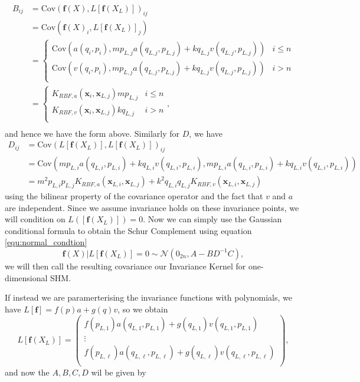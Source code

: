 \documentclass{statsmsc}
\begin{document}
\begin{align*}
B_{ij} &= \mathrm{Cov}(\mathbf{f}(X), L[\mathbf{f}(X_L)])_{ij} \\
       &= \mathrm{Cov}(\mathbf{f}(X)_i, L[\mathbf{f}(X_L)]_j) \\ 
       &= \begin{cases}
        \mathrm{Cov}(a(q_i, p_i), mp_{L,j}a(q_{L,j},p_{L,j}) + kq_{L,j}v(q_{L,j},p_{L,j})) & i\le n \\ 
        \mathrm{Cov}(v(q_i, p_i), mp_{L,j}a(q_{L,j},p_{L,j}) + kq_{L,j}v(q_{L,j},p_{L,j})) & i>n \\ 
       \end{cases} \\
       &= \begin{cases}
        K_{RBF,a}(\mathbf{x}_i, \mathbf{x}_{L,j}) mp_{L,j} & i\le n \\ 
        K_{RBF,v}(\mathbf{x}_i, \mathbf{x}_{L,j}) kq_{L,j} & i>n \\ 
       \end{cases}, \\
\end{align*}
and hence we have the form above. 
Similarly for $D$, we have
\begin{align*}
D_{ij} &= \mathrm{Cov}(L[\mathbf{f}(X_L)], L[\mathbf{f}(X_L)])_{ij} \\
       &= \mathrm{Cov}(mp_{L,i}a(q_{L,i},p_{L,i}) + kq_{L,i}v(q_{L,i},p_{L,i}), mp_{L,i}a(q_{L,i},p_{L,i}) + kq_{L,i}v(q_{L,i},p_{L,i})) \\
       &= m^2p_{L,i}p_{L,j}K_{RBF,a}(\mathbf{x}_{L,i},\mathbf{x}_{L,j}) + k^2q_{L,i}q_{L,j}K_{RBF,v}(\mathbf{x}_{L,i},\mathbf{x}_{L,j})
\end{align*}
using the bilinear property of the covariance operator and the fact that $v$ and $a$ are independent.
Since we assume invariance holds on these invariance points, we will condition on $L([\mathbf{f}(X_L)])=0.$
Now we can simply use the Gaussian conditional formula to obtain the Schur Complement using equation \ref{equ:normal_condtion}
\begin{equation}
\mathbf{f}(X)|L[\mathbf{f}(X_L)]=0\sim\mathcal{N}(0_{2n},A-BD^{-1}C),
\label{equ:shm_invariance}
\end{equation}
we will then call the resulting covariance our Invariance Kernel for one-dimensional SHM.

If instead we are paramerterising the invariance functions with polynomials, we have $L[\mathbf{f}]=f(p)a+g(q)v$, so we obtain
\begin{equation}
L[\mathbf{f}(X_L)] = \begin{pmatrix}
   f(p_{L,1})a(q_{L,1},p_{L,1}) + g(q_{L,1})v(q_{L,1},p_{L,1})\\ 
   \vdots \\
   f(p_{L, \ell})a(q_{L,\ell},p_{L,\ell}) + g(q_{L,\ell})v(q_{L,\ell},p_{L,\ell})\\ 
\end{pmatrix},
\label{equ:joint_ABCDp}
\end{equation}
and now the $A, B, C, D$ wil be given by 
\end{document}
